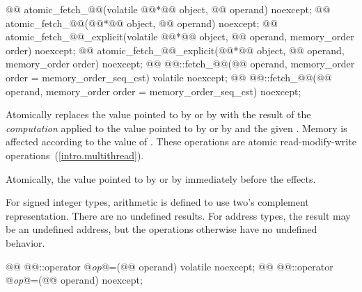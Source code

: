 %
%
%
%
\begin{itemdecl}
@@ atomic_fetch_@@(volatile @@*@\itcorr[-1]@ object, @@ operand) noexcept;
@@ atomic_fetch_@@(@@*@\itcorr[-1]@ object, @@ operand) noexcept;
@@ atomic_fetch_@@_explicit(volatile @@*@\itcorr[-1]@ object, @@ operand, memory_order order) noexcept;
@@ atomic_fetch_@@_explicit(@@*@\itcorr[-1]@ object, @@ operand, memory_order order) noexcept;
@@ @@::fetch_@@(@@ operand, memory_order order = memory_order_seq_cst) volatile noexcept;
@@ @@::fetch_@@(@@ operand, memory_order order = memory_order_seq_cst) noexcept;
\end{itemdecl}

\begin{itemdescr}
\pnum
\effects Atomically replaces the value pointed to by  or by
 with the result of the \textit{computation} applied to the
value pointed to by  or by  and the given .
Memory is affected according to the value of .
These operations are atomic read-modify-write operations~(\ref{intro.multithread}).

\pnum
\returns Atomically, the value pointed to by  or by  immediately before the effects.

\pnum
\remark For signed integer types, arithmetic is defined to use two's complement
representation. There are no undefined results. For address types, the result may be an
undefined address, but the operations otherwise have no undefined behavior.
\end{itemdescr}

%
%
\begin{itemdecl}
@@ @@::operator @\textit{op}@=(@@ operand) volatile noexcept;
@@ @@::operator @\textit{op}@=(@@ operand) noexcept;
\end{itemdecl}

